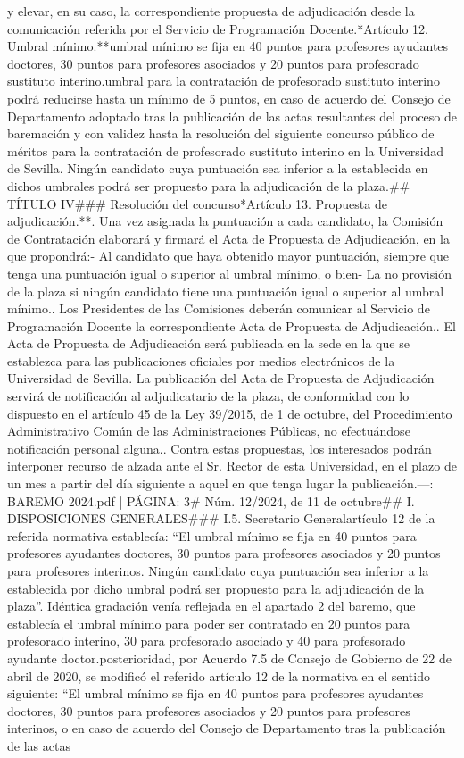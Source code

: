 \documentclass{article}
\begin{document}
\begin{itemize}
{{{{y elevar, en su caso, la correspondiente propuesta de adjudicación desde la comunicación referida por el Servicio de Programación Docente.\n\n**Artículo 12. Umbral mínimo.**\nEl umbral mínimo se fija en 40 puntos para profesores ayudantes doctores, 30 puntos para profesores asociados y 20 puntos para profesorado sustituto interino.\nEl umbral para la contratación de profesorado sustituto interino podrá reducirse hasta un mínimo de 5 puntos, en caso de acuerdo del Consejo de Departamento adoptado tras la publicación de las actas resultantes del proceso de baremación y con validez hasta la resolución del siguiente concurso público de méritos para la contratación de profesorado sustituto interino en la Universidad de Sevilla. Ningún candidato cuya puntuación sea inferior a la establecida en dichos umbrales podrá ser propuesto para la adjudicación de la plaza.\n\n## TÍTULO IV\n### Resolución del concurso\n\n**Artículo 13. Propuesta de adjudicación.**. Una vez asignada la puntuación a cada candidato, la Comisión de Contratación elaborará y firmará el Acta de Propuesta de Adjudicación, en la que propondrá:\n- Al candidato que haya obtenido mayor puntuación, siempre que tenga una puntuación igual o superior al umbral mínimo, o bien\n- La no provisión de la plaza si ningún candidato tiene una puntuación igual o superior al umbral mínimo.. Los Presidentes de las Comisiones deberán comunicar al Servicio de Programación Docente la correspondiente Acta de Propuesta de Adjudicación.. El Acta de Propuesta de Adjudicación será publicada en la sede en la que se establezca para las publicaciones oficiales por medios electrónicos de la Universidad de Sevilla. La publicación del Acta de Propuesta de Adjudicación servirá de notificación al adjudicatario de la plaza, de conformidad con lo dispuesto en el artículo 45 de la Ley 39/2015, de 1 de octubre, del Procedimiento Administrativo Común de las Administraciones Públicas, no efectuándose notificación personal alguna.. Contra estas propuestas, los interesados podrán interponer recurso de alzada ante el Sr. Rector de esta Universidad, en el plazo de un mes a partir del día siguiente a aquel en que tenga lugar la publicación.\n\n---\n\nFUENTE: BAREMO 2024.pdf | PÁGINA: 3\n# Núm. 12/2024, de 11 de octubre\n\n## I. DISPOSICIONES GENERALES\n\n### I.5. Secretario General\n\nEl artículo 12 de la referida normativa establecía: “El umbral mínimo se fija en 40 puntos para profesores ayudantes doctores, 30 puntos para profesores asociados y 20 puntos para profesores interinos. Ningún candidato cuya puntuación sea inferior a la establecida por dicho umbral podrá ser propuesto para la adjudicación de la plaza”. Idéntica gradación venía reflejada en el apartado 2 del baremo, que establecía el umbral mínimo para poder ser contratado en 20 puntos para profesorado interino, 30 para profesorado asociado y 40 para profesorado ayudante doctor.\n\nCon posterioridad, por Acuerdo 7.5 de Consejo de Gobierno de 22 de abril de 2020, se modificó el referido artículo 12 de la normativa en el sentido siguiente: “El umbral mínimo se fija en 40 puntos para profesores ayudantes doctores, 30 puntos para profesores asociados y 20 puntos para profesores interinos, o en caso de acuerdo del Consejo de Departamento tras la publicación de las actas }}}}
\end{itemize}
\end{document}

